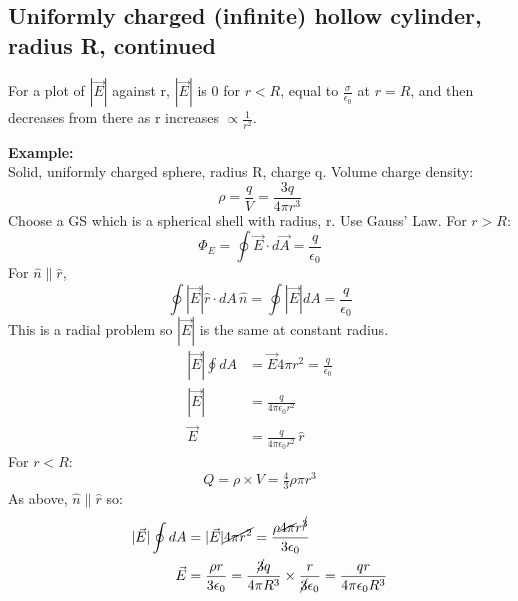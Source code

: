 \documentclass[a4paper, 11pt, normalem]{report}
\begin{document}
\chapter{}
\section{Uniformly charged (infinite) hollow cylinder, radius R, continued}

For a plot of $|\vec{E}|$ against r, $|\vec{E}|$ is 0 for $r < R$, equal to $\frac{\sigma}{\epsilon_{0}}$ at $r = R$, and then decreases from there as r increases $\propto \frac{1}{r^{2}}$.

\textbf{Example:}\\
Solid, uniformly charged sphere, radius R, charge q.
Volume charge density:
\begin{equation}
    \rho = \frac{q}{V} = \frac{3q}{4\pi r^{3}}
\end{equation}
Choose a GS which is a spherical shell with radius, r.
Use Gauss' Law.
For $r > R$:
\begin{equation}
    \Phi_{E} = \oint \vec{E} \cdot d\vec{A} = \frac{q}{\epsilon_{0}}
\end{equation}
For $\hat{n} \parallel \hat{r}$,
\begin{equation}
    \oint |\vec{E}| \hat{r} \cdot dA \, \hat{n} = \oint |\vec{E}|dA = \frac{q}{\epsilon_{0}}
\end{equation}
This is a radial problem so $|\vec{E}|$ is the same at constant radius.
\begin{align}
    |\vec{E}| \oint dA &= \vec{E} 4\pi r^{2} = \frac{q}{\epsilon_{0}} \\
    |\vec{E}| &= \frac{q}{4\pi\epsilon_{0}r^{2}} \\
    \vec{E} &= \frac{q}{4\pi\epsilon_{0}r^{2}} \, \hat{r}
\end{align}
For $r < R$:
\begin{equation}
    Q = \rho \times V = \tfrac{4}{3}\rho\pi r^{3}
\end{equation}
As above, $\hat{n} \parallel \hat{r}$ so:
\begin{align}
    |\vec{E}| \oint dA &= |\vec{E}| \cancel{4\pi r^{2}} = \frac{\rho \cancel{4\pi}r^{\cancel{3}}}{3\epsilon_{0}} \\
    \vec{E} &= \frac{\rho r}{3\epsilon_{0}} = \frac{\cancel{3}q}{4\pi R^{3}} \times \frac{r}{\cancel{3}\epsilon_{0}} = \frac{qr}{4\pi \epsilon_{0} R^{3}}
\end{align}
\end{document}
